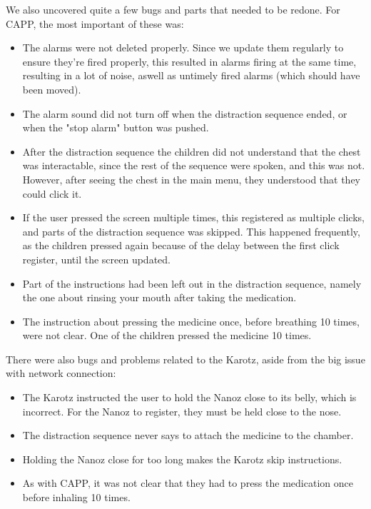 We also uncovered quite a few bugs and parts that needed to be redone. For CAPP, the most important of these was:
\begin{itemize}
	\item The alarms were not deleted properly. Since we update them regularly to ensure they're fired properly, this resulted in alarms firing at the same time, resulting in a lot of noise, aswell as
		untimely fired alarms (which should have been moved).
	\item The alarm sound did not turn off when the distraction sequence ended, or when the "stop alarm" button was pushed. 
	\item After the distraction sequence the children did not understand that the chest was interactable, since the rest of the sequence were spoken, and this was not. However, after seeing the chest
		in the main menu, they understood that they could click it.
	\item If the user pressed the screen multiple times, this registered as multiple clicks, and parts of the distraction sequence was skipped. This happened frequently, as the children pressed again
		because of the delay between the first click register, until the screen updated.
	\item Part of the instructions had been left out in the distraction sequence, namely the one about rinsing your mouth after taking the medication.
	\item The instruction about pressing the medicine once, before breathing 10 times, were not clear. One of the children pressed the medicine 10 times.
\end{itemize}
There were also bugs and problems related to the Karotz, aside from the big issue with network connection:
\begin{itemize}
	\item The Karotz instructed the user to hold the Nanoz close to its belly, which is incorrect. For the Nanoz to register, they must be held close to the nose. 
	\item The distraction sequence never says to attach the medicine to the chamber.
	\item Holding the Nanoz close for too long makes the Karotz skip instructions. 
	\item As with CAPP, it was not clear that they had to press the medication once before inhaling 10 times.
\end{itemize}